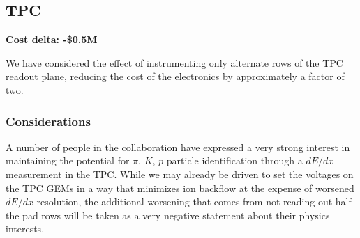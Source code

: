 \subsection{TPC}
\label{tpc}

\textbf{Cost delta: -\$0.5M}

We have considered the effect of instrumenting only alternate rows of
the TPC readout plane, reducing the cost of the electronics by
approximately a factor of two.


\subsubsection*{Considerations}

A number of people in the collaboration have expressed a very strong
interest in maintaining the potential for $\pi$, $K$, $p$ particle
identification through a $dE/dx$ measurement in the TPC.  While we may
already be driven to set the voltages on the TPC GEMs in a way that
minimizes ion backflow at the expense of worsened $dE/dx$ resolution,
the additional worsening that comes from not reading out half the pad
rows will be taken as a very negative statement about their physics
interests.

